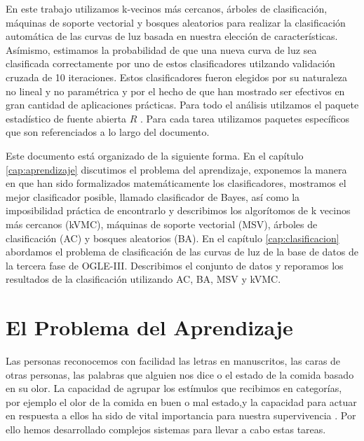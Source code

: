 \documentclass[letterpaper,12pt]{book}
\begin{document}
En este trabajo utilizamos k-vecinos más cercanos, árboles de clasificación, máquinas de soporte vectorial y bosques aleatorios para realizar la clasificación automática de las curvas de luz basada en nuestra elección de características. Asímismo, estimamos la probabilidad de que una nueva curva de luz sea clasificada correctamente por uno de estos clasificadores utilzando validación cruzada de 10 iteraciones.  Estos clasificadores fueron elegidos por su naturaleza no lineal y no paramétrica y por el hecho de que han mostrado ser efectivos en gran cantidad de aplicaciones prácticas. Para todo el análisis utilzamos el paquete estadístico de fuente abierta $R$ \cite{rbase}. Para cada tarea utilizamos paquetes específicos que son referenciados a lo largo del documento. 

Este documento está organizado de la siguiente forma. En el capítulo \ref{cap:aprendizaje} discutimos el problema del aprendizaje, exponemos la manera en que han sido formalizados matemáticamente los clasificadores, mostramos el mejor clasificador posible, llamado clasificador de Bayes, así como la imposibilidad práctica de encontrarlo y describimos los algorítomos de k vecinos más cercanos (kVMC), máquinas de soporte vectorial (MSV), árboles de clasificación (AC) y bosques aleatorios (BA). En el capítulo \ref{cap:clasificacion} abordamos el problema de clasificación de las curvas de luz de la base de datos de la tercera fase de OGLE-III. Describimos el conjunto de datos y reporamos los resultados de la clasificación utilizando AC, BA, MSV y kVMC.


\chapter{El Problema del Aprendizaje \label{cap:aprendizaje}}


Las personas reconocemos con facilidad las letras en manuscritos, las caras de otras personas, las palabras que alguien nos dice o el estado de la comida basado en su olor. La capacidad de agrupar los estímulos que recibimos en categorías, por ejemplo el olor de la comida en buen o mal estado,y la capacidad para actuar en respuesta a ellos ha sido de vital importancia para nuestra supervivencia . Por ello  hemos desarrollado complejos sistemas para llevar a cabo estas tareas. 
\end{document}
